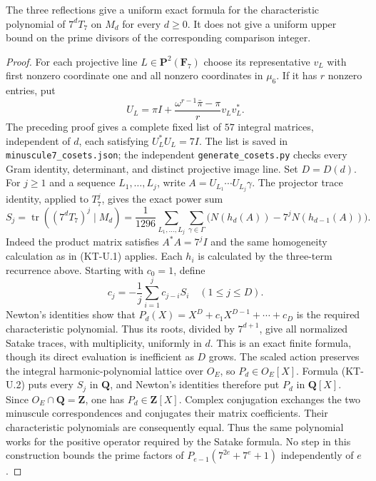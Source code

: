 \begin{proposition}[KT-U3-SPECTRUM]
The three reflections give a uniform exact formula for the
characteristic polynomial of $7^dT_7$ on $M_d$ for every $d\geq0$.
It does not give a uniform upper bound on the prime divisors of the
corresponding comparison integer.
\end{proposition}
\begin{proof}
For each projective line $L\in\mathbf P^2(\mathbf F_7)$ choose its
representative $v_L$ with first nonzero coordinate one and all
nonzero coordinates in $\mu_6$. If it has $r$ nonzero entries, put
\[
 U_L=\pi I+\frac{\omega^{r-1}\bar\pi-\pi}{r}v_Lv_L^*.
\]
The preceding proof gives a complete fixed list of $57$ integral
matrices, independent of $d$, each satisfying $U_L^*U_L=7I$.
The list is saved in \texttt{minuscule7\_cosets.json}; the independent
\texttt{generate\_cosets.py} checks every Gram identity, determinant,
and distinct projective image line.
Set $D=D(d)$. For $j\geq1$ and a sequence $L_1,\ldots,L_j$,
write $A=U_{L_1}\cdots U_{L_j}\gamma$.
The projector trace identity, applied to $T_7^j$, gives the exact
power sum
\[
 S_j=\operatorname{tr}((7^dT_7)^j\mid M_d)
 =\frac1{1296}
   \sum_{L_1,\ldots,L_j}\sum_{\gamma\in\Gamma}
       \bigl(N(h_d(A))-7^jN(h_{d-1}(A))\bigr).       \tag{KT-U.2}
\]
Indeed the product matrix satisfies $A^*A=7^jI$ and the same
homogeneity calculation as in (KT-U.1) applies.
Each $h_i$ is calculated by the three-term recurrence above.
Starting with $c_0=1$, define
\[
           c_j=-\frac1j\sum_{i=1}^j c_{j-i}S_i
           \quad(1\leq j\leq D).
\]
Newton's identities show that
$P_d(X)=X^D+c_1X^{D-1}+\cdots+c_D$ is the required
characteristic polynomial. Thus its roots, divided by $7^{d+1}$,
give all normalized Satake traces, with multiplicity, uniformly
in $d$. This is an exact finite formula, though its direct evaluation
is inefficient as $D$ grows.
The scaled action preserves the integral harmonic-polynomial
lattice over $O_E$, so $P_d\in O_E[X]$.
Formula (KT-U.2) puts every $S_j$ in $\mathbf Q$, and Newton's
identities therefore put $P_d$ in $\mathbf Q[X]$.
Since $O_E\cap\mathbf Q=\mathbf Z$, one has
$P_d\in\mathbf Z[X]$.
Complex conjugation exchanges the two minuscule correspondences
and conjugates their matrix coefficients. Their characteristic
polynomials are consequently equal. Thus the same polynomial
works for the positive operator required by the Satake formula.
No step in this construction bounds the prime factors of
$P_{e-1}(7^{2e}+7^e+1)$ independently of $e$.
\end{proof}

